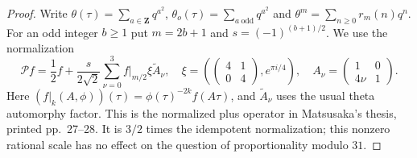 \documentclass[11pt,a4paper]{article}
\theoremstyle{definition}
\begin{document}
\begin{proof}
Write $\theta(\tau)=\sum_{a\in\mathbf Z}q^{a^2}$,
$\theta_o(\tau)=\sum_{a\ \mathrm{odd}}q^{a^2}$ and
$\theta^m=\sum_{n\ge0}r_m(n)q^n$.
For an odd integer $b\ge1$ put $m=2b+1$ and
$s=(-1)^{(b+1)/2}$.  We use the normalization
\[
 \mathcal P f=\frac12f+
 \frac{s}{2\sqrt2}\sum_{\nu=0}^3 f|_{m/2}\xi\widetilde A_\nu,
 \quad
 \xi=\left(\begin{pmatrix}4&1\\0&4\end{pmatrix},e^{\pi i/4}\right),
 \quad A_\nu=\begin{pmatrix}1&0\\4\nu&1\end{pmatrix}.
                                                        \tag{KTHT.1}
\]
Here $(f|_k(A,\phi))(\tau)=\phi(\tau)^{-2k}f(A\tau)$,
and $\widetilde A_\nu$ uses the usual theta automorphy factor.
This is the normalized plus operator in Matsusaka's thesis,
printed pp.~27--28.  It is $3/2$ times the idempotent
normalization; this nonzero rational scale has no effect on the
question of proportionality modulo $31$.


\end{proof}
\end{document}
